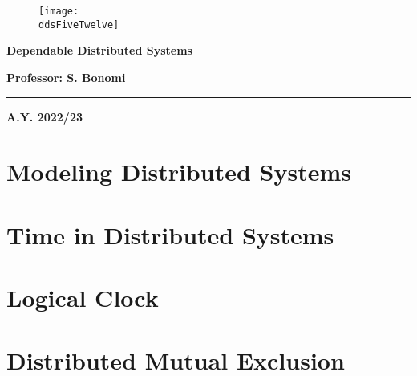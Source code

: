 

	
	\begin{center}
		\begin{figure}[h]
			\centering
			\texttt{[image: \\ddsFiveTwelve]}
		\end{figure}
		\vspace{1cm} 
		{\fontsize{28}{34}\selectfont \textbf{Dependable Distributed Systems}}
	\end{center}

	\vspace{1cm} 
	
	\begin{center}
	{\fontsize{22}{28}\selectfont \textbf{Professor: S. Bonomi}}
	\end{center}

	\vspace{1cm} 

	\textcolor{blue!60!black}{\rule{\linewidth}{2pt}}
	
	\vspace{10cm} 
	
	\begin{center}
	\textbf{A.Y. 2022/23} 
	\end{center}

	\thispagestyle{empty}
	
	\newpage
	
	\myTOC
		
	\newpage

	\section{Modeling Distributed Systems}
	
	\newpage
	\section{Time in Distributed Systems}
	
	\newpage
	\section{Logical Clock}
	
	\newpage
	\section{Distributed Mutual Exclusion}
	
